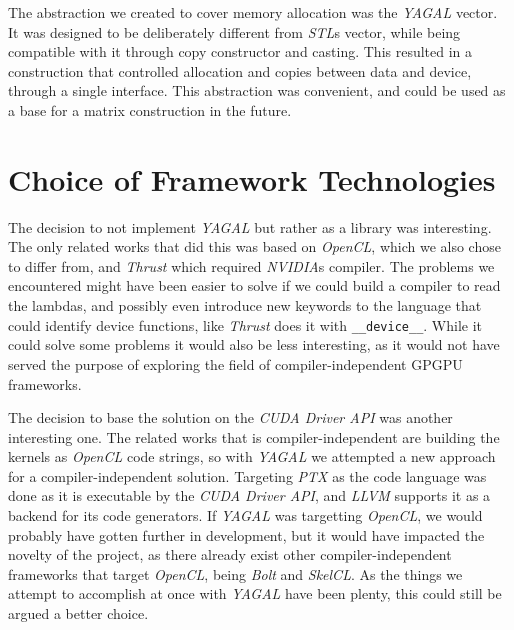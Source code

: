 The abstraction we created to cover memory allocation was the \textit{YAGAL} vector. It was designed to be deliberately different from \textit{STL}s vector, while being compatible with it through copy constructor and casting. This resulted in a construction that controlled allocation and copies between data and device, through a single interface. This abstraction was convenient, and could be used as a base for a matrix construction in the future.

\section{Choice of Framework Technologies}
The decision to not implement \textit{YAGAL} but rather as a library was interesting. The only related works that did this was based on \textit{OpenCL}, which we also chose to differ from, and \textit{Thrust} which required \textit{NVIDIA}s compiler. The problems we encountered might have been easier to solve if we could build a compiler to read the lambdas, and possibly even introduce new keywords to the language that could identify device functions, like \textit{Thrust} does it with \texttt{\_\_device\_\_}. While it could solve some problems it would also be less interesting, as it would not have served the purpose of exploring the field of compiler-independent GPGPU frameworks.  

The decision to base the solution on the \textit{CUDA Driver API} was another interesting one. The related works that is compiler-independent are building the kernels as \textit{OpenCL} code strings, so with \textit{YAGAL} we attempted a new approach for a compiler-independent solution. Targeting \textit{PTX} as the code language was done as it is executable by the \textit{CUDA Driver API}, and \textit{LLVM} supports it as a backend for its code generators. If \textit{YAGAL} was targetting \textit{OpenCL}, we would probably have gotten further in development, but it would have impacted the novelty of the project, as there already exist other compiler-independent frameworks that target \textit{OpenCL}, being \textit{Bolt} and \textit{SkelCL}. As the things we attempt to accomplish at once with \textit{YAGAL} have been plenty, this could still be argued a better choice.

